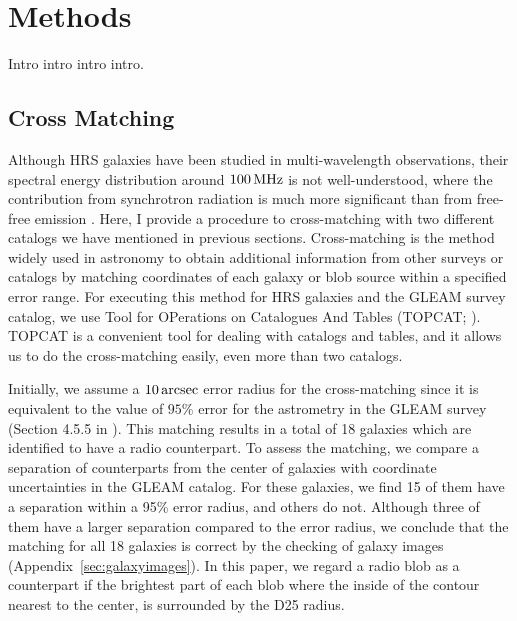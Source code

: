 \chapter{Methods}\label{chap:methods}
\begin{chapabstract}

Intro intro intro intro.

\end{chapabstract}

\section{Cross Matching}\label{sec:crossmatching}
Although HRS galaxies have been studied in multi-wavelength observations, their spectral energy distribution around $100\,\mathrm{MHz}$ is not well-understood, where the contribution from synchrotron radiation is much more significant than from free-free emission \citep{Condon1992a}.
Here, I provide a procedure to cross-matching with two different catalogs we have mentioned in previous sections.
Cross-matching is the method widely used in astronomy to obtain additional information from other surveys or catalogs by matching coordinates of each galaxy or blob source within a specified error range.
For executing this method for HRS galaxies and the GLEAM survey catalog, we use Tool for OPerations on Catalogues And Tables (TOPCAT\@; \citealt{Taylor2009}).
TOPCAT is a convenient tool for dealing with catalogs and tables, and it allows us to do the cross-matching easily, even more than two catalogs.

Initially, we assume a $10\,\mathrm{arcsec}$ error radius for the cross-matching since it is equivalent to the value of $95\%$ error for the astrometry in the GLEAM survey (Section 4.5.5 in \citealt{Hurley-Walker2017a}).
This matching results in a total of 18 galaxies which are identified to have a radio counterpart.
To assess the matching, we compare a separation of counterparts from the center of galaxies with coordinate uncertainties in the GLEAM catalog.
For these galaxies, we find 15 of them have a separation within a 95\% error radius, and others do not.
Although three of them have a larger separation compared to the error radius, we conclude that the matching for all 18 galaxies is correct by the checking of galaxy images (Appendix~\ref{sec:galaxyimages}).
In this paper, we regard a radio blob as a counterpart if the brightest part of each blob where the inside of the contour nearest to the center, is surrounded by the D25 radius.

